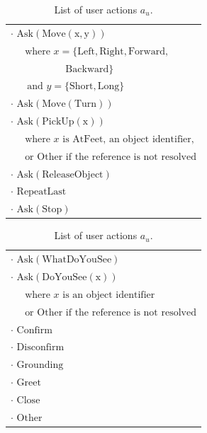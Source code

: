 \begin{table}[p!]
\begin{footnotesize}
\begin{tabular}{p{60mm}} 
$\cdot$ $\mathrm{Ask(Move(x,y))} $ \\ $ \ \ \ \ \ \text{ where } x=\{\mathrm{Left,Right,Forward,}$ \\ $\ \ \ \ \ \ \ \ \ \ \ \ \ \ \ \ \ \ \ \ \ \ \ \ \ \mathrm{Backward}\} $ \\ $ \ \ \ \ \ \ \text{ and } y = \{\mathrm{Short,Long}\}$ \\
$\cdot$ $\mathrm{Ask(Move(Turn))} $ \\
$\cdot$ $\mathrm{Ask(PickUp(x))} $ \\ $\ \ \ \ \  \text{ where } x \text{ is }   \mathrm{AtFeet} \text{,  an object identifier,}$ \\ $\ \ \ \ \  \text{ or }  \mathrm{Other} \text{ if the reference is not resolved}$ \\
$\cdot$ $\mathrm{Ask(ReleaseObject)} $ \\
$\cdot$ $\mathrm{RepeatLast}$ \\
$\cdot$ $\mathrm{Ask(Stop)}$ 
\end{tabular}
\hspace{2cm}
\begin{tabular}{p{60mm}} 
$\cdot$ $\mathrm{Ask(WhatDoYouSee)}$ \\
$\cdot$ $\mathrm{Ask(DoYouSee(x))} $ \\ $\ \ \ \ \  \text{ where } x \text{ is an object identifier }$ \\ $\ \ \ \ \  \text{ or }  \mathrm{Other} \text{ if the reference is not resolved}$ \\
$\cdot$ $\mathrm{Confirm}$ \\
$\cdot$ $\mathrm{Disconfirm}$ \\
$\cdot$ $\mathrm{Grounding}$ \\
$\cdot$ $\mathrm{Greet}$ \\
$\cdot$ $\mathrm{Close}$ \\
$\cdot$ $\mathrm{Other}$ 
\end{tabular}
\end{footnotesize}
 \caption{List of user actions $a_u$.} 
\label{table:userdas_exp3}
\end{table}

